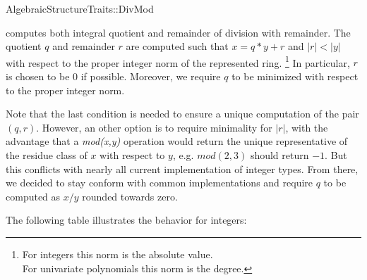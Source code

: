 \begin{ccRefFunctionObjectConcept}{AlgebraicStructureTraits::DivMod}

\ccDefinition

 computes both integral quotient and remainder
of division with remainder. The quotient $q$ and remainder $r$ are computed 
such that $x = q*y + r$ and $|r| < |y|$ with respect to the proper integer norm of 
the represented ring.
\footnote{
For integers this norm is the absolute value.\\ 
For univariate polynomials this norm is the degree.} 
In particular, $r$ is chosen to be $0$ if possible.
Moreover, we require $q$ to be minimized with respect to the proper integer norm.  



Note that the last condition is needed to ensure a unique computation of the 
pair $(q,r)$. However, an other option is to require minimality for $|r|$, 
with the advantage that
a {\em mod(x,y)} operation would return the unique representative of the 
residue class of $x$ with respect to $y$, e.g. $mod(2,3)$ should return $-1$. 
But this conflicts with nearly all current implementation 
of integer types. From there, we decided to stay conform with common 
implementations and require $q$ to be computed as $x/y$ rounded towards zero. 


The following table illustrates the behavior for integers: 


\end{ccRefFunctionObjectConcept}
